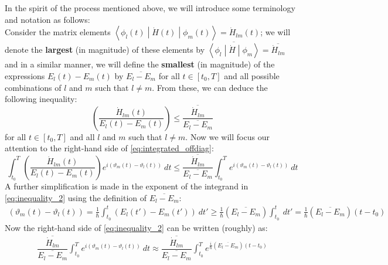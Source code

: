 \documentclass[12pt,a4paper]{article}
\begin{document}
	In the spirit of the process mentioned above, we will introduce some terminology and notation as follows:\\
	Consider the matrix elements $\left\langle \phi_{l}(t) \middle| \dot{H}(t) \middle| \phi_{m}(t) \right\rangle = \dot{H}_{lm}(t)$; we will denote the \textbf{largest} (in magnitude) of these elements by $\overline{\left\langle \phi_{l} \middle| \dot{H} \middle| \phi_{m} \right\rangle} = \overline{\dot{H}_{lm}}$ and in a similar manner, we will define the \textbf{smallest} (in magnitude) of the expressions $E_{l}(t) - E_{m}(t)$ by $\overline{E_{l} - E_{m}}$ for all $t \in \left[t_{0}, T\right]$ and all possible combinations of $l$ and $m$ such that $l \neq m$. From these, we can deduce the following inequality:
	\begin{equation}
		\left(\dfrac{\dot{H}_{lm}(t)}{E_{l}(t) - E_{m}(t)}\right) \leq \dfrac{\overline{\dot{H}_{lm}}}{\overline{E_{l} - E_{m}}}
		\label{eq:inequality_1}
	\end{equation} 
	for all $t \in \left[ t_{0}, T \right]$ and all $l$ and $m$ such that $l \neq m$. Now we will focus our attention to the right-hand side of \eqref{eq:integrated_offdiag}:
	\begin{equation}
		\int_{t_{0}}^{T} \left(\dfrac{\dot{H}_{lm}(t)}{E_{l}(t) - E_{m}(t)}\right) e^{i \left( \vartheta_{m}(t) - \vartheta_{l}(t) \right)}\ dt \leq \dfrac{\overline{\dot{H}_{lm}}}{\overline{E_{l} - E_{m}}} \int_{t_{0}}^{T} e^{i \left( \vartheta_{m}(t) - \vartheta_{l}(t) \right)}\ dt
		\label{eq:inequality_2}
	\end{equation}
	A further simplification is made in the exponent of the integrand in \eqref{eq:inequality_2} using the definition of $\overline{E_{l} - E_{m}}$:
	\begin{align}
		\left( \vartheta_{m}(t) - \vartheta_{l}(t) \right) = \frac{1}{\hbar} \int_{t_{0}}^{t} \left( E_{l}(t') - E_{m}(t') \right)\ dt' \geq \frac{1}{\hbar} \left( \overline{E_{l} - E_{m}} \right) \int_{t_{0}}^{t} \ dt' = \frac{1}{\hbar} \left( \overline{E_{l} - E_{m}} \right) \left( t - t_{0} \right)\nonumber
	\end{align}
	Now the right-hand side of \eqref{eq:inequality_2} can be written (roughly) as:
	\begin{align}
		\dfrac{\overline{\dot{H}_{lm}}}{\overline{E_{l} - E_{m}}} \int_{t_{0}}^{T} e^{i \left( \vartheta_{m}(t) - \vartheta_{l}(t) \right)}\ dt \approx \dfrac{\overline{\dot{H}_{lm}}}{\overline{E_{l} - E_{m}}} \int_{t_{0}}^{T} e^{\frac{i}{\hbar} \left( \overline{E_{l} - E_{m}} \right) \left( t - t_{0} \right)}
		\label{eq:integral_approx}
	\end{align} 
\end{document}
